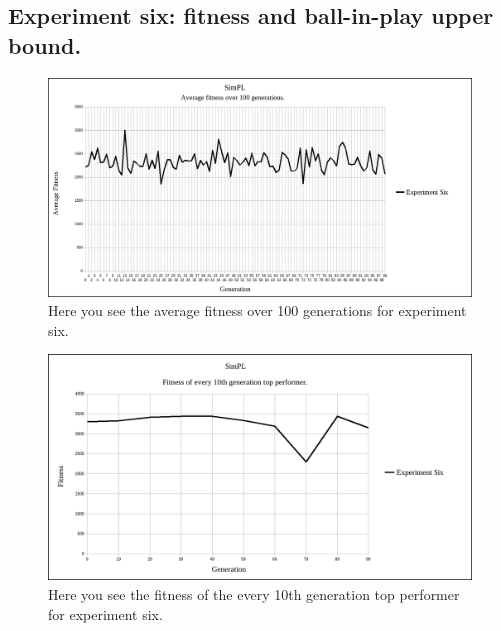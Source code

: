\documentclass[a4paper,10pt]{article}
\begin{document}
\subsection{Experiment six: fitness and ball-in-play upper bound.}

\begin{figure}[H]  
  \centering
  \includegraphics[width=1\textwidth]{figures/exp6_avg_fit.png}
  \caption{Here you see the average fitness over 100 generations for experiment six.}
  \label{fig:exp6_avg_fit}
\end{figure}

\begin{figure}[H]  
  \centering
  \includegraphics[width=1\textwidth]{figures/exp6_10_tops.png}
  \caption{Here you see the fitness of the every 10th generation top performer for experiment six.}
  \label{fig:exp6_10_tops}
\end{figure}
\end{document}
